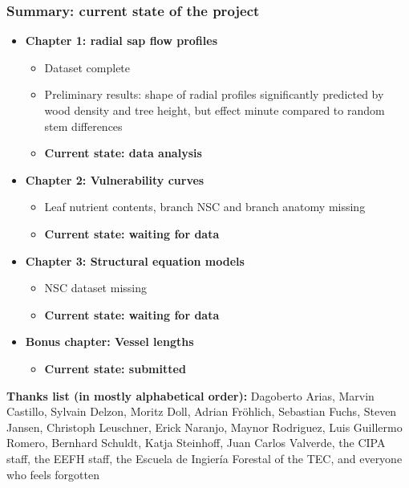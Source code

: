 \documentclass[usepdftitle=false]{beamer}
\newcommand{\Blue}[1]{{\color{blue!50!black}\textbf{#1}}}
\begin{document}
\begin{frame}
	\frametitle{Summary: current state of the project}	
	\begin{itemize}
		\item<1-> \Blue{Chapter 1: radial sap flow profiles}
		\begin{itemize}
			\item Dataset complete
			\item Preliminary results: shape of radial profiles significantly predicted by wood density and tree height, but effect minute compared to random stem differences 
			\item \textbf{Current state: \alert<1>{data analysis}}
		\end{itemize}
		\item<2-> \Blue{Chapter 2: Vulnerability curves}
		\begin{itemize}
			\item Leaf nutrient contents, branch NSC and branch anatomy missing
			\item \textbf{Current state: \alert<2>{waiting for data}}
		\end{itemize}
		\item<3-> \Blue{Chapter 3: Structural equation models}
		\begin{itemize}
			\item NSC dataset missing
			\item \textbf{Current state: \alert<3>{waiting for data}}
		\end{itemize}
		\item<4-> \Blue{Bonus chapter: Vessel lengths}
		\begin{itemize}
			\item \textbf{Current state: \alert<4>{submitted}}
		\end{itemize}
	\end{itemize}
\end{frame}

	\begin{frame}[plain]
		\begin{block}{\textbf{Thanks list (in mostly alphabetical order):}}
			Dagoberto Arias, Marvin Castillo, Sylvain Delzon, Moritz Doll, Adrian Fröhlich, Sebastian Fuchs, Steven Jansen, Christoph Leuschner, Erick Naranjo, Maynor Rodriguez, Luis Guillermo Romero, Bernhard Schuldt, Katja Steinhoff, Juan Carlos Valverde, the CIPA staff, the EEFH staff, the Escuela de Ingiería Forestal of the TEC, and everyone who feels forgotten
		\end{block}		
	\end{frame}
\end{document}
